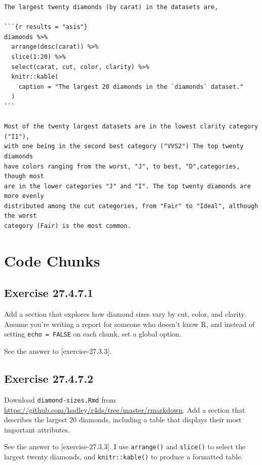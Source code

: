 \documentclass[]{book}
\theoremstyle{plain}
\theoremstyle{remark}
\begin{document}
\begin{verbatim}
The largest twenty diamonds (by carat) in the datasets are,

```{r results = "asis"}
diamonds %>%
  arrange(desc(carat)) %>%
  slice(1:20) %>%
  select(carat, cut, color, clarity) %>%
  knitr::kable(
    caption = "The largest 20 diamonds in the `diamonds` dataset."
  )
```

Most of the twenty largest datasets are in the lowest clarity category ("I1"),
with one being in the second best category ("VVS2") The top twenty diamonds 
have colors ranging from the worst, "J", to best, "D",categories, though most
are in the lower categories "J" and "I". The top twenty diamonds are more evenly
distributed among the cut categories, from "Fair" to "Ideal", although the worst
category (Fair) is the most common.
\end{verbatim}

\hypertarget{code-chunks}{%
\section{Code Chunks}\label{code-chunks}}

\hypertarget{exercise-27.4.7.1}{%
\subsection*{\texorpdfstring{Exercise {27.4.7.1}}{Exercise 27.4.7.1}}\label{exercise-27.4.7.1}}

Add a section that explores how diamond sizes vary by cut, color, and clarity.
Assume you're writing a report for someone who doesn't know R, and instead of
setting \texttt{echo\ =\ FALSE} on each chunk, set a global option.

See the answer to {[}exercise-27.3.3{]}.

\hypertarget{exercise-27.4.7.2}{%
\subsection*{\texorpdfstring{Exercise {27.4.7.2}}{Exercise 27.4.7.2}}\label{exercise-27.4.7.2}}

Download \texttt{diamond-sizes.Rmd} from \url{https://github.com/hadley/r4ds/tree/master/rmarkdown}. Add a section that describes the largest 20 diamonds, including a table that displays their most important attributes.

See the answer to {[}exercise-27.3.3{]}.
I use \texttt{arrange()} and \texttt{slice()} to select the largest twenty diamonds, and
\texttt{knitr::kable()} to produce a formatted table.
\end{document}
